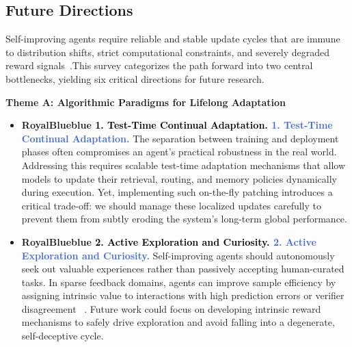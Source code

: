 \documentclass{article}
\let\oldtextcolor\textcolor
\renewcommand{\textcolor}[2]{
  \def\temp{#1}
  \def\red{blue}
  \ifx\temp\red
    \oldtextcolor{black}{#2}
  \else
    \oldtextcolor{#1}{#2}
  \fi
}
\begin{document}
\subsection{Future Directions}
Self-improving agents require reliable and stable update cycles that are immune to distribution shifts, strict computational constraints, and severely degraded reward signals~\citep{zhuge2026ai}.This survey categorizes the path forward into two central bottlenecks, yielding six critical directions for future research.



\vspace{0.35em}
\noindent\textbf{Theme A: Algorithmic Paradigms for Lifelong Adaptation}
\vspace{0.2em}

\begin{itemize}[leftmargin=*, label={}, itemsep=0.9em, topsep=0.2em]
\item \textbf{\textcolor{RoyalBlue}{1. Test-Time Continual Adaptation.}} 
The separation between training and deployment phases often compromises an agent's practical robustness in the real world. Addressing this requires scalable test-time adaptation mechanisms \citep{xia2025livesweagentsoftwareengineeringagents, yang2026ttcstesttimecurriculumsynthesis} that allow models to update their retrieval, routing, and memory policies dynamically during execution. Yet, implementing such on-the-fly patching introduces a critical trade-off: we should manage these localized updates carefully to prevent them from subtly eroding the system's long-term global performance.



\item \textbf{\textcolor{RoyalBlue}{2. Active Exploration and Curiosity.}}  
Self-improving agents should autonomously seek out valuable experiences rather than passively accepting human-curated tasks. In sparse feedback domains, agents can improve sample efficiency by assigning intrinsic value to interactions with high prediction errors or verifier disagreement ~\citep{schmidhuber1991possibility, zhao2026curious}. Future work could focus on developing intrinsic reward mechanisms to safely drive exploration and avoid falling into a degenerate, self-deceptive cycle.



\end{itemize}
\end{document}
